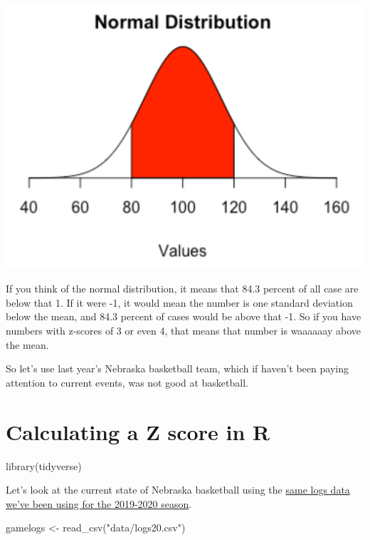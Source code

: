 \documentclass[
]{book}
\newenvironment{Shaded}{\begin{snugshade}}{\end{snugshade}}
\newcommand{\FunctionTok}[1]{\textcolor[rgb]{0.00,0.00,0.00}{#1}}
\newcommand{\NormalTok}[1]{#1}
\newcommand{\OtherTok}[1]{\textcolor[rgb]{0.56,0.35,0.01}{#1}}
\newcommand{\StringTok}[1]{\textcolor[rgb]{0.31,0.60,0.02}{#1}}
\begin{document}
\includegraphics[width=17.64in]{images/simulations2}

If you think of the normal distribution, it means that 84.3 percent of all case are below that 1. If it were -1, it would mean the number is one standard deviation below the mean, and 84.3 percent of cases would be above that -1. So if you have numbers with z-scores of 3 or even 4, that means that number is waaaaaay above the mean.

So let's use last year's Nebraska basketball team, which if haven't been paying attention to current events, was not good at basketball.

\hypertarget{calculating-a-z-score-in-r}{%
\section{Calculating a Z score in R}\label{calculating-a-z-score-in-r}}

\begin{Shaded}
\begin{Highlighting}[]
\FunctionTok{library}\NormalTok{(tidyverse)}
\end{Highlighting}
\end{Shaded}

Let's look at the current state of Nebraska basketball using the \href{https://unl.box.com/s/yc01x7ae7r2jtuixo4j3s3s0ed7o5f8g}{same logs data we've been using for the 2019-2020 season}.

\begin{Shaded}
\begin{Highlighting}[]
\NormalTok{gamelogs }\OtherTok{\textless{}{-}} \FunctionTok{read\_csv}\NormalTok{(}\StringTok{"data/logs20.csv"}\NormalTok{)}
\end{Highlighting}
\end{Shaded}
\end{document}
